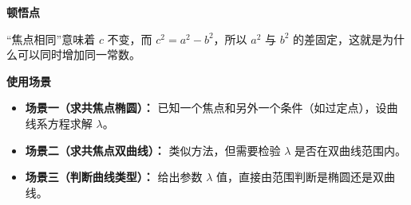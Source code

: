 \begin{explanationbox}
	\medskip
	\textbf{\textcolor{CExplanation}{顿悟点}}

	“焦点相同”意味着 $c$ 不变，而 $c^2=a^2-b^2$，所以 $a^2$ 与 $b^2$ 的差固定，这就是为什么可以同时增加同一常数。

	\medskip
	\textbf{\textcolor{CExplanation}{使用场景}}
	\begin{itemize}[leftmargin=*, itemsep=0.5em, topsep=0.4em]
		\item \textbf{场景一（求共焦点椭圆）：} 已知一个焦点和另外一个条件（如过定点），设曲线系方程求解 $\lambda$。
		\item \textbf{场景二（求共焦点双曲线）：} 类似方法，但需要检验 $\lambda$ 是否在双曲线范围内。
		\item \textbf{场景三（判断曲线类型）：} 给出参数 $\lambda$ 值，直接由范围判断是椭圆还是双曲线。
	\end{itemize}
\end{explanationbox}
